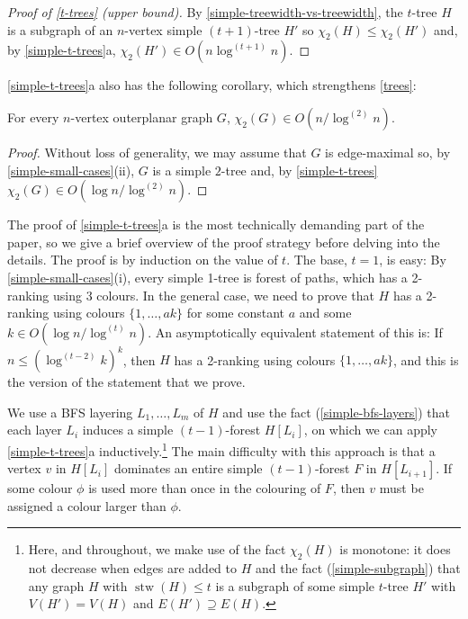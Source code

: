 \documentclass[kpfonts]{patmorin}
\DeclareMathOperator{\stw}{stw}
\newcommand{\trn}{\chi_2}
\theoremstyle{named}
\newcommand{\weirdref}[2]{\cref{#1}#2}
\begin{document}
\begin{proof}[Proof of \cref{t-trees} (upper bound)]
    By \cref{simple-treewidth-vs-treewidth}, the $t$-tree $H$ is a subgraph of an $n$-vertex simple $(t+1)$-tree $H'$ so $\trn(H)\le \trn(H')$ and, by   \weirdref{simple-t-trees}{a}, $\trn(H')\in O(n\log^{(t+1)}n)$.
\end{proof}

\weirdref{simple-t-trees}{a} also has the following corollary, which strengthens \cref{trees}:

\begin{cor}\label{outerplanar}
    For every $n$-vertex outerplanar graph $G$, $\trn(G)\in O(n/\log^{(2)} n)$.
\end{cor}

\begin{proof}
    Without loss of generality, we may assume that $G$ is edge-maximal so, by \cref{simple-small-cases}{(ii)}, $G$ is a simple $2$-tree and, by \cref{simple-t-trees} $\trn(G)\in O(\log n/\log^{(2)} n)$.
\end{proof}


The proof of \weirdref{simple-t-trees}{a} is the most technically demanding part of the paper, so we give a brief overview of the proof strategy before delving into the details.  The proof is by induction on the value of $t$.  The base, $t=1$, is easy: By \cref{simple-small-cases}(i), every simple 1-tree is forest of paths, which has a 2-ranking using 3 colours.  In the general case, we need to prove that $H$ has a 2-ranking using colours $\{1,\ldots,ak\}$ for some constant $a$ and some $k\in O(\log n/\log^{(t)} n)$.  An asymptotically equivalent statement of this is: If $n \le (\log^{(t-2)}k)^k$, then $H$ has a 2-ranking using colours $\{1,\ldots,ak\}$, and this is the version of the statement that we prove.

We use a BFS layering $L_1,\ldots,L_m$ of $H$ and use the fact (\cref{simple-bfs-layers}) that each layer $L_i$ induces a simple $(t-1)$-forest $H[L_i]$, on which we can apply \weirdref{simple-t-trees}{a} inductively.\footnote{Here, and throughout, we make use of the fact $\trn(H)$ is monotone: it does not decrease when edges are added to $H$ and the fact (\cref{simple-subgraph}) that any graph $H$ with $\stw(H)\le t$ is a subgraph of some simple $t$-tree $H'$ with $V(H')=V(H)$ and $E(H')\supseteq E(H)$.}  The main difficulty with this approach is that a vertex $v$ in $H[L_i]$ dominates an entire simple $(t-1)$-forest $F$ in $H[L_{i+1}]$.  If some colour $\phi$ is used more than once in the colouring of $F$, then $v$ must be assigned a colour larger than $\phi$.
\end{document}
